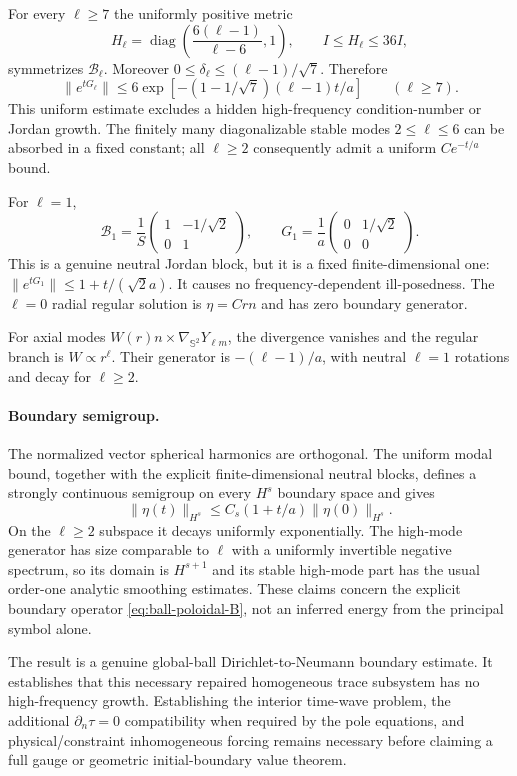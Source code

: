 For every $\ell\ge7$ the uniformly positive metric
\[
 H_\ell=\operatorname{diag}
       \left(\frac{6(\ell-1)}{\ell-6},1\right),
 \qquad I\le H_\ell\le36I,
\]
symmetrizes $\mathcal B_\ell$. Moreover
$0\le\delta_\ell\le(\ell-1)/\sqrt7$. Therefore
\begin{equation}
 \|e^{tG_\ell}\|\le
 6\exp\left[-(1-1/\sqrt7)(\ell-1)t/a\right]
 \qquad(\ell\ge7).
 \label{eq:ball-high-modal-energy}
\end{equation}
This uniform estimate excludes a hidden high-frequency condition-number or
Jordan growth. The finitely many diagonalizable stable modes $2\le\ell\le6$
can be absorbed in a fixed constant; all $\ell\ge2$ consequently admit a
uniform $Ce^{-t/a}$ bound.

For $\ell=1$,
\[
 \mathcal B_1=\frac1S
 \begin{pmatrix}1&-1/\sqrt2\\0&1\end{pmatrix},\qquad
 G_1=\frac1a\begin{pmatrix}0&1/\sqrt2\\0&0\end{pmatrix}.
\]
This is a genuine neutral Jordan block, but it is a fixed finite-dimensional
one: $\|e^{tG_1}\|\le1+t/(\sqrt2a)$. It causes no frequency-dependent
ill-posedness. The $\ell=0$ radial regular solution is $\eta=C r n$ and has
zero boundary generator.

For axial modes $W(r)n\times\nabla_{\mathbb S^2}Y_{\ell m}$, the divergence
vanishes and the regular branch is $W\propto r^\ell$. Their generator is
$-(\ell-1)/a$, with neutral $\ell=1$ rotations and decay for $\ell\ge2$.

\paragraph{Boundary semigroup.}
The normalized vector spherical harmonics are orthogonal. The uniform modal
bound, together with the explicit finite-dimensional neutral blocks, defines
a strongly continuous semigroup on every $H^s$ boundary space and gives
\[
 \|\eta(t)\|_{H^s}\le C_s(1+t/a)\|\eta(0)\|_{H^s}.
\]
On the $\ell\ge2$ subspace it decays uniformly exponentially. The high-mode
generator has size comparable to $\ell$ with a uniformly invertible negative
spectrum, so its domain is $H^{s+1}$ and its stable high-mode part has the
usual order-one analytic smoothing estimates. These claims concern the
explicit boundary operator \eqref{eq:ball-poloidal-B}, not an inferred
energy from the principal symbol alone.

The result is a genuine global-ball Dirichlet-to-Neumann boundary estimate.
It establishes that this necessary repaired homogeneous trace subsystem has
no high-frequency growth. Establishing the interior time-wave problem,
the additional $\partial_n\tau=0$ compatibility when required by the pole
equations, and physical/constraint inhomogeneous forcing remains necessary
before claiming a full gauge or geometric initial-boundary value theorem.
